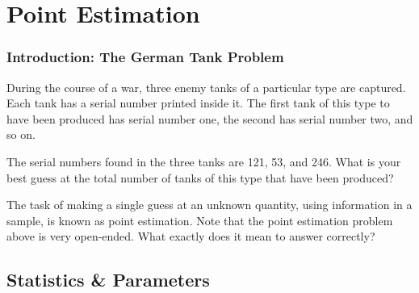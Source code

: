 \pagestyle{headings}
\chapter{Point Estimation} \label{chp 6}
\thispagestyle{fancy}

\subsection*{Introduction: The German Tank Problem}

During the course of a war, three enemy tanks of a particular type are captured. Each tank has a serial number printed inside it. The first tank of this type to have been produced has serial number one, the second has serial number two, and so on. 
\par
The serial numbers found in the three tanks are 121, 53, and 246. What is your best guess at the total number of tanks of this type that have been produced?
\par
The task of making a single guess at an unknown quantity, using information in a sample, is known as point estimation. Note that the point estimation problem above is very open-ended. What exactly does it mean to answer correctly?
\par

\section{Statistics \& Parameters}

